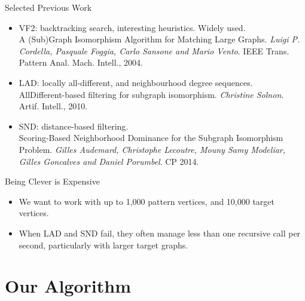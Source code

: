 \documentclass{beamer}
\begin{document}
\begin{frame}{Selected Previous Work}
    \begin{itemize}
        \item VF2: backtracking search, interesting heuristics. Widely used. \\[0.1cm]
            {\scriptsize A (Sub)Graph Isomorphism Algorithm for Matching Large Graphs. \emph{Luigi P.
                Cordella, Pasquale Foggia, Carlo Sansone and Mario Vento}. {IEEE} Trans.
        Pattern Anal. Mach. Intell., 2004.}

        \item LAD: locally all-different, and neighbourhood degree sequences. \\[0.1cm]
            {\scriptsize AllDifferent-based filtering for subgraph isomorphism. \emph{Christine
                Solnon}.  Artif. Intell., 2010.}
        \item SND: distance-based filtering. \\[0.1cm]
            {\scriptsize Scoring-Based Neighborhood Dominance for the Subgraph Isomorphism Problem.
                \emph{Gilles Audemard, Christophe Lecoutre, Mouny Samy Modeliar, Gilles
            Goncalves and Daniel Porumbel}. CP 2014.}
    \end{itemize}
\end{frame}

\begin{frame}{Being Clever is Expensive}
    \begin{itemize}
        \item We want to work with up to 1,000 pattern vertices, and 10,000 target vertices.

        \item When LAD and SND fail, they often manage less than one recursive call per second,
            particularly with larger target graphs.
    \end{itemize}
\end{frame}

\section{Our Algorithm}
\frame{\sectionpage}
\end{document}
